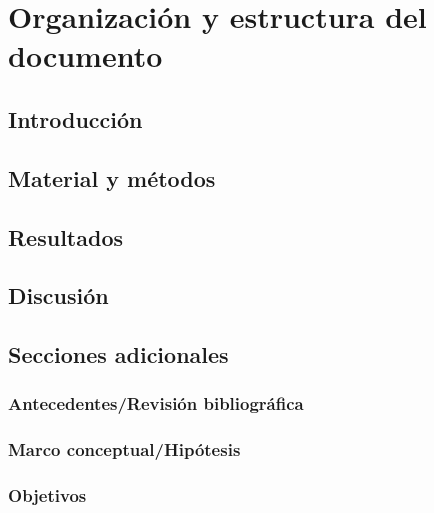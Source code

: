 \documentclass[
]{book}
\begin{document}
\hypertarget{organizaciuxf3n-y-estructura-del-documento}{%
\chapter{Organización y estructura del documento}\label{organizaciuxf3n-y-estructura-del-documento}}

\hypertarget{introducciuxf3n}{%
\section{Introducción}\label{introducciuxf3n}}

\hypertarget{material-y-muxe9todos}{%
\section{Material y métodos}\label{material-y-muxe9todos}}

\hypertarget{resultados}{%
\section{Resultados}\label{resultados}}

\hypertarget{discusiuxf3n}{%
\section{Discusión}\label{discusiuxf3n}}

\hypertarget{secciones-adicionales}{%
\section{Secciones adicionales}\label{secciones-adicionales}}

\hypertarget{antecedentesrevisiuxf3n-bibliogruxe1fica}{%
\subsection{Antecedentes/Revisión bibliográfica}\label{antecedentesrevisiuxf3n-bibliogruxe1fica}}

\hypertarget{marco-conceptualhipuxf3tesis}{%
\subsection{Marco conceptual/Hipótesis}\label{marco-conceptualhipuxf3tesis}}

\hypertarget{objetivos}{%
\subsection{Objetivos}\label{objetivos}}
\end{document}
